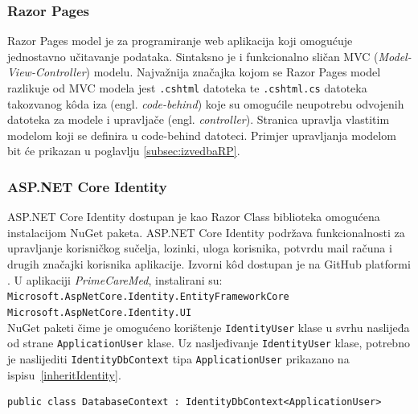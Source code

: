 \subsubsection{Razor Pages}
Razor Pages model je za programiranje web aplikacija koji omogućuje jednostavno učitavanje podataka. Sintaksno je i funkcionalno sličan MVC (\textit{Model-View-Controller}) modelu. Najvažnija značajka kojom se Razor Pages model razlikuje od MVC modela jest \texttt{.cshtml} datoteka te \texttt{.cshtml.cs} datoteka takozvanog k\^oda iza (engl. \textit{code-behind}) koje su omogućile neupotrebu odvojenih datoteka za modele i upravljače (engl. \textit{controller}). Stranica upravlja vlastitim modelom koji se definira u code-behind datoteci\cite{RazorPages}. Primjer upravljanja modelom bit će prikazan u poglavlju \ref{subsec:izvedbaRP}.

\subsubsection{ASP.NET Core Identity}
\label{subsubsec:IdentityCore}
 
ASP.NET Core Identity dostupan je kao Razor Class biblioteka omogućena instalacijom NuGet paketa.  ASP.NET Core Identity podržava funkcionalnosti za upravljanje korisničkog sučelja, lozinki, uloga korisnika, potvrdu mail računa i drugih značajki korisnika aplikacije. Izvorni k\^od dostupan je na GitHub platformi \cite{aspNETGitHub}. U aplikaciji \textit{PrimeCareMed}, instalirani su: \\ \texttt{Microsoft.AspNetCore.Identity.EntityFrameworkCore} \\ \texttt{Microsoft.AspNetCore.Identity.UI}  \\ NuGet paketi čime je omogućeno korištenje \texttt{IdentityUser} klase u svrhu naslijeđa od strane \texttt{ApplicationUser} klase. Uz nasljeđivanje \texttt{IdentityUser} klase, potrebno je naslijediti \texttt{IdentityDbContext} tipa \texttt{ApplicationUser} prikazano na ispisu~\ref{inheritIdentity}.
\begin{lstlisting}[caption={Nasljeđivanje \texttt{IdentityDbContext} klase}, label=inheritIdentity]
public class DatabaseContext : IdentityDbContext<ApplicationUser>
\end{lstlisting}

